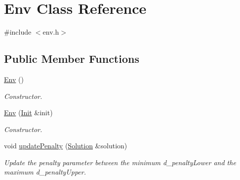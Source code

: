 \hypertarget{class_env}{}\section{Env Class Reference}
\label{class_env}


{\ttfamily \#include $<$env.\+h$>$}

\subsection*{Public Member Functions}
\begin{DoxyCompactItemize}
\item 
\mbox{\label{class_env_a60054c2be7d109a6d1b740af6896198b}} 
\hyperlink{class_env_a60054c2be7d109a6d1b740af6896198b}{Env} ()
\begin{DoxyCompactList}\small\item\em Constructor. \end{DoxyCompactList}\item 
\hyperlink{class_env_abef807205f56ffe87706b5413c0de75f}{Env} (\hyperlink{class_init}{Init} \&init)
\begin{DoxyCompactList}\small\item\em Constructor. \end{DoxyCompactList}\item 
void \hyperlink{class_env_a05decf6ad0f2370b38fd8c403777a9ca}{update\+Penalty} (\hyperlink{class_solution}{Solution} \&solution)
\begin{DoxyCompactList}\small\item\em Update the penalty parameter between the minimum d\+\_\+penalty\+Lower and the maximum d\+\_\+penalty\+Upper. \end{DoxyCompactList}\end{DoxyCompactItemize}
